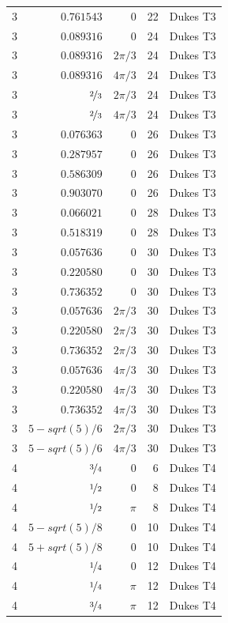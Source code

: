 \documentclass[aps,pra,reprint,amsmath,amssymb,superscriptaddress,floatfix]{revtex4-2}
\def\frac#1#2{#1/#2}%
\def\sqrt#1{sqrt(#1)}%
\begin{document}
\begin{longtable}{rrrrc}
3 & $0.761543$ & $0$ & 22 & Dukes T3 \\
3 & $0.089316$ & $0$ & 24 & Dukes T3 \\
3 & $0.089316$ & $2\pi/3$ & 24 & Dukes T3 \\
3 & $0.089316$ & $4\pi/3$ & 24 & Dukes T3 \\
3 & $\nicefrac{2}{3}$ & $2\pi/3$ & 24 & Dukes T3 \\
3 & $\nicefrac{2}{3}$ & $4\pi/3$ & 24 & Dukes T3 \\
3 & $0.076363$ & $0$ & 26 & Dukes T3 \\
3 & $0.287957$ & $0$ & 26 & Dukes T3 \\
3 & $0.586309$ & $0$ & 26 & Dukes T3 \\
3 & $0.903070$ & $0$ & 26 & Dukes T3 \\
3 & $0.066021$ & $0$ & 28 & Dukes T3 \\
3 & $0.518319$ & $0$ & 28 & Dukes T3 \\
3 & $0.057636$ & $0$ & 30 & Dukes T3 \\
3 & $0.220580$ & $0$ & 30 & Dukes T3 \\
3 & $0.736352$ & $0$ & 30 & Dukes T3 \\
3 & $0.057636$ & $2\pi/3$ & 30 & Dukes T3 \\
3 & $0.220580$ & $2\pi/3$ & 30 & Dukes T3 \\
3 & $0.736352$ & $2\pi/3$ & 30 & Dukes T3 \\
3 & $0.057636$ & $4\pi/3$ & 30 & Dukes T3 \\
3 & $0.220580$ & $4\pi/3$ & 30 & Dukes T3 \\
3 & $0.736352$ & $4\pi/3$ & 30 & Dukes T3 \\
3 & $\frac{5 - \sqrt{5}}{6}$ & $2\pi/3$ & 30 & Dukes T3 \\
3 & $\frac{5 - \sqrt{5}}{6}$ & $4\pi/3$ & 30 & Dukes T3 \\
4 & $\nicefrac{3}{4}$ & $0$ & 6 & Dukes T4 \\
4 & $\nicefrac{1}{2}$ & $0$ & 8 & Dukes T4 \\
4 & $\nicefrac{1}{2}$ & $\pi$ & 8 & Dukes T4 \\
4 & $\frac{5 - \sqrt{5}}{8}$ & $0$ & 10 & Dukes T4 \\
4 & $\frac{5 + \sqrt{5}}{8}$ & $0$ & 10 & Dukes T4 \\
4 & $\nicefrac{1}{4}$ & $0$ & 12 & Dukes T4 \\
4 & $\nicefrac{1}{4}$ & $\pi$ & 12 & Dukes T4 \\
4 & $\nicefrac{3}{4}$ & $\pi$ & 12 & Dukes T4 \\

\end{longtable}
\end{document}
